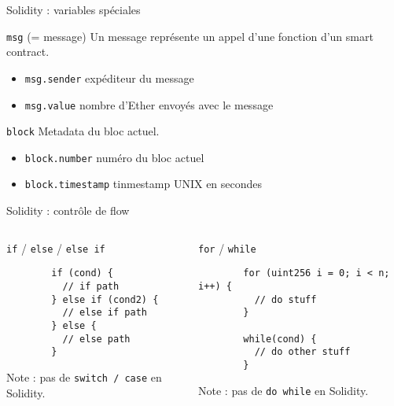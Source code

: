 \begin{frame}{Solidity : variables spéciales}
  \begin{block}{\texttt{msg} (= message)}
    Un message représente un appel d'une fonction d'un smart contract.

    \begin{itemize}
      \item \texttt{msg.sender} expéditeur du message
      \item \texttt{msg.value} nombre d'Ether envoyés avec le message
    \end{itemize}
  \end{block}


  \begin{block}{\texttt{block}}
    Metadata du bloc actuel.

    \begin{itemize}
      \item \texttt{block.number} numéro du bloc actuel
      \item \texttt{block.timestamp} tinmestamp UNIX en secondes
    \end{itemize}
  \end{block}
\end{frame}

\begin{frame}[fragile]{Solidity : contrôle de flow}
  \begin{columns}
    \begin{column}{0.47\textwidth}
      \texttt{if} / \texttt{else} / \texttt{else if}

      \begin{verbatim}
        if (cond) {
          // if path
        } else if (cond2) {
          // else if path
        } else {
          // else path
        }
      \end{verbatim}

      Note : pas de \texttt{switch / case} en Solidity.
    \end{column}
    \vspace{0.03\textwidth}
    \begin{column}{0.47\textwidth}
      \texttt{for} / \texttt{while}

      \begin{verbatim}
        for (uint256 i = 0; i < n; i++) {
          // do stuff
        }

        while(cond) {
          // do other stuff
        }
      \end{verbatim}

      Note : pas de \texttt{do while} en Solidity.
    \end{column}
  \end{columns}
\end{frame}

